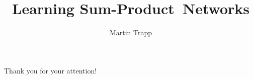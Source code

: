 \documentclass{beamer}
\title[Sum-Product Networks] { Learning Sum-Product~Networks }
\author { Martin Trapp }
\date{}
\begin{document}
\maketitle












\begin{frame}{}

\centering
Thank you for your attention!

\end{frame}
\end{document}
